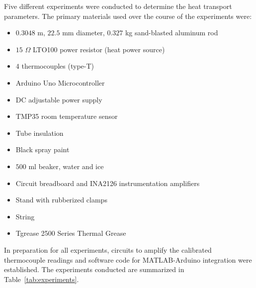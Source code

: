 \documentclass[10pt,aps,prb,twocolumn, nofootinbib]{revtex4-1}
\begin{document}
Five different experiments were conducted to determine the heat transport parameters. The primary materials used over the course of the experiments were:
	\begin{itemize}\parskip0pt
    	\item $0.3048$ m, $22.5$ mm diameter, $0.327$ kg sand-blasted aluminum rod
        \item $15$ $\Omega$ LTO100 power resistor (heat power source)
        \item $4$ thermocouples (type-T)
        \item Arduino Uno Microcontroller 
        \item DC adjustable power supply
        \item TMP35 room temperature sensor
        \item Tube insulation
        \item Black spray paint
        \item $500$ ml beaker, water and ice
        \item Circuit breadboard and INA2126 instrumentation amplifiers
        \item Stand with rubberized clamps
        \item String
        \item Tgrease 2500 Series Thermal Grease
    \end{itemize}
    
In preparation for all experiments, circuits to amplify the calibrated thermocouple readings and software code for MATLAB-Arduino integration were established.
The experiments conducted are summarized in Table~\ref{tab:experiments}. 
\end{document}
